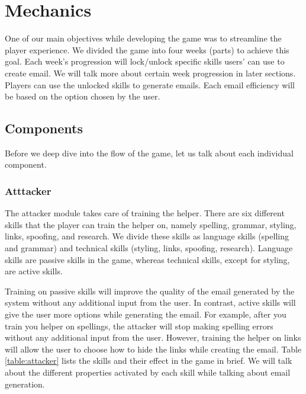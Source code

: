 \section{Mechanics}
One of our main objectives while developing the game was to streamline the player experience. We divided the game into four weeks (parts) to achieve this goal. Each week's progression will lock/unlock specific skills users' can use to create email. We will talk more about certain week progression in later sections. Players can use the unlocked skills to generate emails. Each email efficiency will be based on the option chosen by the user.

\subsection{Components}
Before we deep dive into the flow of the game, let us talk about each individual component.

\subsubsection{Atttacker}
The attacker module takes care of training the helper. There are six different skills that the player can train the helper on, namely spelling, grammar, styling, links, spoofing, and research. We divide these skills as language skills (spelling and grammar) and technical skills (styling, links, spoofing, research). Language skills are passive skills in the game, whereas technical skills, except for styling, are active skills.

Training on passive skills will improve the quality of the email generated by the system without any additional input from the user. In contrast, active skills will give the user more options while generating the email. For example, after you train you helper on spellings, the attacker will stop making spelling errors without any additional input from the user. However, training the helper on links will allow the user to choose how to hide the links while creating the email. Table \ref{table:attacker} lists the skills and their effect in the game in brief. We will talk about the different properties activated by each skill while talking about email generation.

